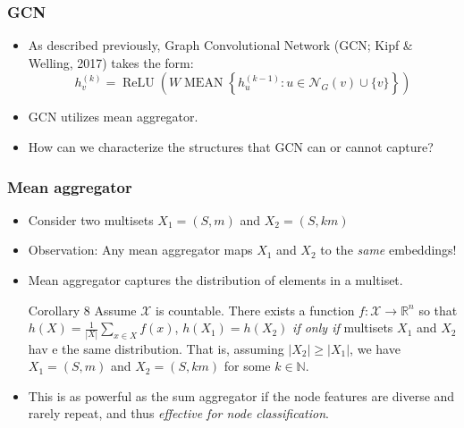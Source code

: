 \documentclass{beamer}
\DeclareMathOperator{\MEAN}{MEAN}
\DeclareMathOperator{\relu}{ReLU}
\begin{document}
\begin{frame}
\frametitle{GCN}

\begin{itemize}
	\item As described previously, Graph Convolutional Network (GCN; Kipf \& Welling, 2017) takes the form:
	$$h_v^{(k)} = \relu \left( W \MEAN \left\{ h_u^{(k - 1)} : u \in \mathcal{N}_G(v) \cup \{v\} \right\} \right)$$ \pause
	
	\item GCN utilizes mean aggregator. \pause
	
	\item How can we characterize the structures that GCN can or cannot capture?
\end{itemize}

\end{frame}

\begin{frame}
\frametitle{Mean aggregator}

\begin{itemize}
	\item Consider two multisets $X_1 = (S, m)$ and $X_2 = (S, k m)$ \pause
	
	\item Observation: Any mean aggregator maps $X_1$ and $X_2$ to the {\it same} embeddings! \pause
	
	\item Mean aggregator captures the distribution of elements in a multiset. \pause

\begin{block}{Corollary 8}
Assume $\mathcal{X}$ is countable.
There exists a function $f : \mathcal{X} \rightarrow \mathbb{R}^n$ so that $h(X) = \frac{1}{|X|}\sum_{x \in X} f(x)$, $h(X_1) = h(X_2)$ {\it if only if} multisets $X_1$ and $X_2$ hav e the same distribution.
That is, assuming $|X_2| \geq |X_1|$, we have $X_1 = (S, m)$ and $X_2 = (S, k m)$ for some $k \in \mathbb{N}$.

\end{block} \pause

	\item This is as powerful as the sum aggregator if the node features are diverse and rarely repeat, and thus {\it effective for node classification}.

\end{itemize}
\end{frame}
\end{document}
